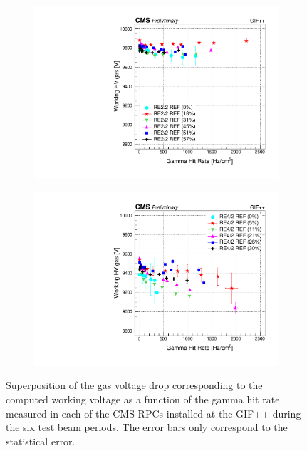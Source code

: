 \begin{figure}[H]
\begin{subfigure}{0.5\linewidth}
    		\includegraphics[width = \linewidth]{fig/chapt5/RE2-2_REF_HVgas_vs_Rate.pdf}
        	\caption{\label{fig:GIFpp_hvgas_vs_rate:C}}
    	\end{subfigure}
    	\begin{subfigure}{0.5\linewidth}
			\centering
    		\includegraphics[width = \linewidth]{fig/chapt5/RE4-2_REF_HVgas_vs_Rate.pdf}
        	\caption{\label{fig:GIFpp_hvgas_vs_rate:D}}
    	\end{subfigure}
		\caption{\label{fig:GIFpp_hvgas_vs_rate} Superposition of the gas voltage drop corresponding to the computed working voltage as a function of the gamma hit rate measured in each of the CMS RPCs installed at the GIF++ during the six test beam periods. The error bars only correspond to the statistical error.}
	\end{figure}
	
